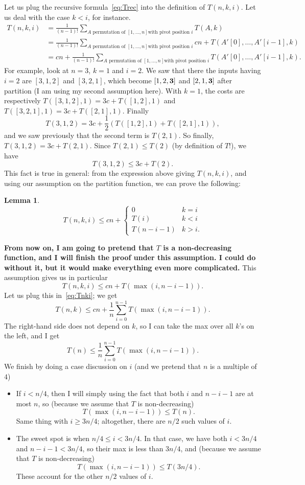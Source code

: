 \documentclass{report}
\newtheorem{lemma}{Lemma}
\begin{document}
Let us plug the recursive formula~\eqref{eq:Trec} into
the definition of $T(n,k,i)$. Let us deal with the case
$k < i$, for instance. 
\begin{align*}
T(n,k,i)&=
\frac 1{(n-1)!} \sum_{A \text{~permutation of $[1,\dots,n]$
with pivot position $i$}} T(A,k)  \\
&= 
\frac 1{(n-1)!} \sum_{A 
\text{~permutation of $[1,\dots,n]$
with pivot position $i$}} cn + T(A'[0],\dots,A'[i-1], k)\\
&= cn + 
\frac 1{(n-1)!} \sum_{A 
\text{~permutation of $[1,\dots,n]$
with pivot position $i$}}  T(A'[0],\dots,A'[i-1], k).
\end{align*}
For example, look at $n=3$, $k=1$ and $i=2$. We saw that 
there the inputs having $i=2$ are $[3,1,2]$ and $[3,2,1]$,
which become $[1,2,{\bf 3}]$ and $[2,1,{\bf 3}]$ after partition
(I am using my second assumption here). With $k=1$, the costs are respectively
$T([3,1,2], 1) = 3 c + T([1,2], 1)$ and 
$T([3,2,1], 1) = 3 c + T([2,1], 1)$. Finally 
$$T(3,1,2) = 3 c + \frac 12 (T([1,2], 1) + T([2,1], 1)),$$ and we saw
previously that the second term is $T(2,1)$.  So finally, $T(3,1,2) =
3 c + T(2,1)$.  Since $T(2,1) \le T(2)$ (by definition of $T$!), we
have
$$T(3,1,2) \le 3 c + T(2).$$
This fact is true in general: from the expression above giving $T(n,k,i)$,
and using our assumption on the partition function, we can prove the following:
\begin{lemma}
  $$T(n,k,i) \le c n +
\begin{cases}
0 & k=i\\
T(i) & k < i \\
T(n-i-1) & k > i.
\end{cases}
$$
\end{lemma}
{\bf From now on, I am going to pretend that $T$ is a non-decreasing
function, and I will finish the proof under this assumption. I could do 
without it, but it would make everything even more complicated.} This 
assumption gives us in particular
$$T(n,k,i) \le cn + T(\max(i, n-i-1)). $$
Let us plug this in~\eqref{eq:Tnki}; we get
$$T(n,k) \le cn+ \frac  1n \sum_{i=0}^{n-1} T(\max(i, n-i-1)).$$
The right-hand side does not depend on $k$, so I can take the max over 
all $k$'s on the left, and I get
\begin{equation}\label{eq:Tn}
T(n) \le \frac  1n \sum_{i=0}^{n-1} T(\max(i, n-i-1)).  
\end{equation}
We finish by doing a case discussion on $i$ (and we pretend that $n$ 
is a multiple of $4$)
\begin{itemize}
\item If $i < n/4$, then I will simply using the fact 
that both $i$ and $n-i-1$ are at most $n$, so
(because we assume that $T$ is non-decreasing)
$$T(\max(i,n-i-1)) \le T(n).$$ Same thing with $i \ge 3n/4$;
altogether, there are $n/2$ such values of $i$.
\item The sweet spot is when $n/4 \le i < 3n/4$. In that case,
we have both $i < 3n/4$ and $n-i-1 < 3n/4$, 
so their max is less than $3n/4$, and 
(because we assume that $T$ is non-decreasing)
$$T(\max(i, n-i-1)) \le T(3n/4).$$
These account for the other $n/2$ values of $i$.
\end{itemize}
\end{document}
